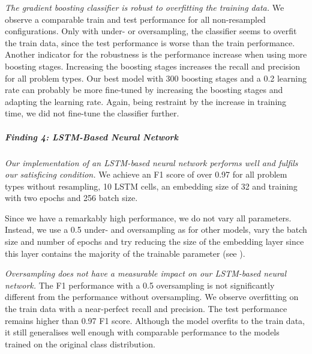 \textit{The gradient boosting classifier is robust to overfitting the training data.} We observe a comparable train and test performance for all non-resampled configurations. Only with under- or oversampling, the classifier seems to overfit the train data, since the test performance is worse than the train performance. 
Another indicator for the robustness is the performance increase when using more boosting stages. Increasing the boosting stages increases the recall and precision for all problem types. Our best model with 300 boosting stages and a 0.2 learning rate can probably be more fine-tuned by increasing the boosting stages and adapting the learning rate. Again, being restraint by the increase in training time, we did not fine-tune the classifier further.

\begin{center}
\end{center}


\subparagraph{Finding 4: LSTM-Based Neural Network}
\textit{Our implementation of an LSTM-based neural network performs well and fulfils our satisficing condition.} We achieve an F1 score of over 0.97 for all problem types without resampling, 10 LSTM cells, an embedding size of 32 and training with two epochs and 256 batch size. 


Since we have a remarkably high performance, we do not vary all parameters. Instead, we use a 0.5 under- and oversampling as for other models, vary the batch size and number of epochs and try reducing the size of the embedding layer since this layer contains the majority of the trainable parameter (see ).


\textit{Oversampling does not have a measurable impact on our LSTM-based neural network.} The F1 performance with a 0.5 oversampling is not significantly different from the performance without oversampling. We observe overfitting on the train data with a near-perfect recall and precision. The test performance remains higher than 0.97 F1 score. Although the model overfits to the train data, it still generalises well enough with comparable performance to the models trained on the original class distribution.


